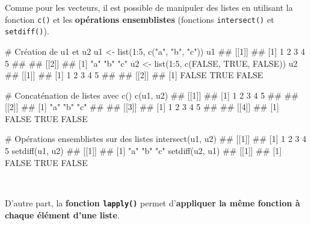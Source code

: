 \documentclass[12pt,twosided, notitlepage]{book}
\newenvironment{Shaded}{}{}
\newcommand{\KeywordTok}[1]{\textcolor[rgb]{0.00,0.00,1.00}{#1}}
\newcommand{\DecValTok}[1]{#1}
\newcommand{\StringTok}[1]{\textcolor[rgb]{0.00,0.50,0.50}{#1}}
\newcommand{\CommentTok}[1]{\textcolor[rgb]{0.00,0.50,0.00}{#1}}
\newcommand{\OtherTok}[1]{\textcolor[rgb]{1.00,0.25,0.00}{#1}}
\newcommand{\OperatorTok}[1]{#1}
\newcommand{\NormalTok}[1]{#1}
\renewenvironment{Shaded}{\begin{snugshade}}{\end{snugshade}}
\begin{document}
Comme pour les vecteurs, il est possible de manipuler des listes en
utilisant la fonction \texttt{c()} et les
\textbf{opérations ensemblistes} (fonctions
\texttt{intersect()} et
\texttt{setdiff()}).

\begin{Shaded}
\begin{Highlighting}[]
\CommentTok{# Création de u1 et u2}
\NormalTok{u1 <-}\StringTok{ }\KeywordTok{list}\NormalTok{(}\DecValTok{1}\OperatorTok{:}\DecValTok{5}\NormalTok{, }\KeywordTok{c}\NormalTok{(}\StringTok{"a"}\NormalTok{, }\StringTok{"b"}\NormalTok{, }\StringTok{"c"}\NormalTok{))}
\NormalTok{u1}
\NormalTok{  ## [[1]]}
\NormalTok{  ## [1] 1 2 3 4 5}
\NormalTok{  ## }
\NormalTok{  ## [[2]]}
\NormalTok{  ## [1] "a" "b" "c"}
\NormalTok{u2 <-}\StringTok{ }\KeywordTok{list}\NormalTok{(}\DecValTok{1}\OperatorTok{:}\DecValTok{5}\NormalTok{, }\KeywordTok{c}\NormalTok{(}\OtherTok{FALSE}\NormalTok{, }\OtherTok{TRUE}\NormalTok{, }\OtherTok{FALSE}\NormalTok{))}
\NormalTok{u2}
\NormalTok{  ## [[1]]}
\NormalTok{  ## [1] 1 2 3 4 5}
\NormalTok{  ## }
\NormalTok{  ## [[2]]}
\NormalTok{  ## [1] FALSE  TRUE FALSE}

\CommentTok{# Concaténation de listes avec c()}
\KeywordTok{c}\NormalTok{(u1, u2)}
\NormalTok{  ## [[1]]}
\NormalTok{  ## [1] 1 2 3 4 5}
\NormalTok{  ## }
\NormalTok{  ## [[2]]}
\NormalTok{  ## [1] "a" "b" "c"}
\NormalTok{  ## }
\NormalTok{  ## [[3]]}
\NormalTok{  ## [1] 1 2 3 4 5}
\NormalTok{  ## }
\NormalTok{  ## [[4]]}
\NormalTok{  ## [1] FALSE  TRUE FALSE}

\CommentTok{# Opérations ensemblistes sur des listes}
\KeywordTok{intersect}\NormalTok{(u1, u2)}
\NormalTok{  ## [[1]]}
\NormalTok{  ## [1] 1 2 3 4 5}
\KeywordTok{setdiff}\NormalTok{(u1, u2)}
\NormalTok{  ## [[1]]}
\NormalTok{  ## [1] "a" "b" "c"}
\KeywordTok{setdiff}\NormalTok{(u2, u1)}
\NormalTok{  ## [[1]]}
\NormalTok{  ## [1] FALSE  TRUE FALSE}
\end{Highlighting}
\end{Shaded}

~

D'autre part, la \textbf{fonction \texttt{lapply()}} permet
d'\textbf{appliquer la même fonction à chaque élément d'une
liste}.
\end{document}
